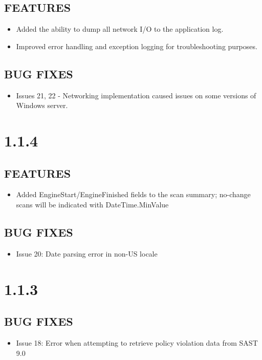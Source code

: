 \subsection*{FEATURES}
    \begin{itemize}
        \item Added the ability to dump all network I/O to the application log.
        \item Improved error handling and exception logging for troubleshooting purposes.
    \end{itemize}
\subsection*{BUG FIXES}
    \begin{itemize}
        \item Issues 21, 22 - Networking implementation caused issues on some versions of Windows server.
    \end{itemize}


\section{1.1.4}
\subsection*{FEATURES}
    \begin{itemize}
        \item Added EngineStart/EngineFinished fields to the scan summary; no-change scans will be indicated with DateTime.MinValue
    \end{itemize}
\subsection*{BUG FIXES}
    \begin{itemize}
        \item Issue 20: Date parsing error in non-US locale
    \end{itemize}

\section{1.1.3}
\subsection*{BUG FIXES}
    \begin{itemize}
        \item Issue 18: Error when attempting to retrieve policy violation data from SAST 9.0
    \end{itemize}


